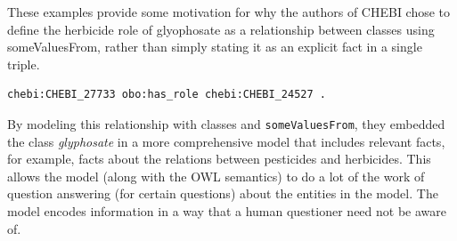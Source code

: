 These examples provide some motivation for why the authors of CHEBI
chose to define the
herbicide role of glyophosate as a relationship between classes using
someValuesFrom, rather than simply stating it as an explicit fact in a
single triple.

\begin{lstlisting}
chebi:CHEBI_27733 obo:has_role chebi:CHEBI_24527 .
\end{lstlisting}

By modeling this relationship with classes and \texttt{someValuesFrom}, they
embedded the class \textit{glyphosate} in a more comprehensive model that
includes relevant facts, for example, facts about the relations between
pesticides and herbicides. This allows the model (along with the OWL
semantics) to do a lot of the work of question answering (for certain
questions) about the entities in the model. The model encodes
information in a way that a human questioner need not be aware of.


